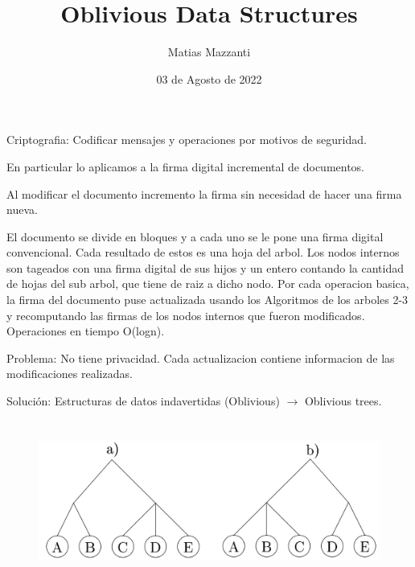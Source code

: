\documentclass[10pt]{beamer}
\title[Algoritmos y estructuras de datos 2]{Oblivious Data Structures}
\author[Matias Mazzanti]{Matias Mazzanti}
\institute{DC-UBA}
\date{03 de Agosto de 2022}
\begin{document}
\begin{frame}

\maketitle

\end{frame}

\section{}
\begin{frame}
\frametitle{}
Criptografia: Codificar mensajes y operaciones por motivos de seguridad.

En particular lo aplicamos a la firma digital incremental de documentos.

Al modificar el documento incremento la firma sin necesidad de hacer una firma nueva.


El documento se divide en bloques y a cada uno se le pone una firma digital convencional.
Cada resultado de estos es una hoja del arbol.
Los nodos internos son tageados con una firma digital de sus hijos y un entero contando
la cantidad de hojas del sub arbol, que tiene de raiz a dicho nodo.
Por cada operacion basica, la firma del documento puse actualizada usando los Algoritmos
de los arboles 2-3 y recomputando las firmas de los nodos internos que fueron modificados.
Operaciones en tiempo O(logn).

Problema: No tiene privacidad. Cada actualizacion contiene informacion de las modificaciones realizadas.

Solución: Estructuras de datos indavertidas (Oblivious) $\rightarrow$ Oblivious trees.

\end{frame}
\section{}
\begin{frame}
\frametitle{}
\begin{figure}[h!]
    \centering
    \includegraphics[scale=0.25]{2-3tree.jpg}
\end{figure}


\end{frame}
\end{document}
